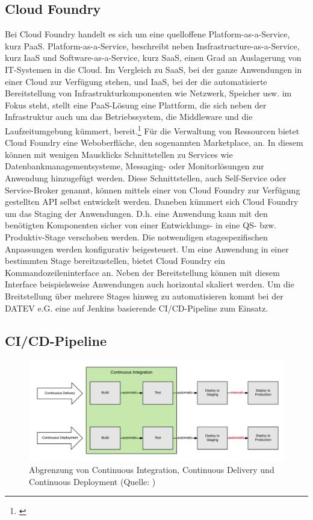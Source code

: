 \subsection{\glqq Cloud Foundry\grqq}
Bei Cloud Foundry handelt es sich um eine quelloffene Platform-as-a-Service, kurz PaaS.
Platform-as-a-Service, beschreibt neben Insfrastructure-as-a-Service, kurz IaaS und Software-as-a-Service, kurz SaaS, einen Grad an Auslagerung von IT-Systemen in die Cloud.
Im Vergleich zu SaaS, bei der ganze Anwendungen in einer Cloud zur Verfügung stehen, und IaaS, bei der die automatisierte Bereitstellung von Infrastrukturkomponenten wie Netzwerk, Speicher usw. im Fokus steht, stellt eine PaaS-Lösung eine Plattform, die sich neben der Infrastruktur auch um das Betriebssystem, die Middleware und die Laufzeitumgebung kümmert, bereit.\footnote{\cite{ipsaas.25.2.2020}}
Für die Verwaltung von Ressourcen bietet Cloud Foundry eine Weboberfläche, den sogenannten \glqq Marketplace\grqq, an.
In diesem können mit wenigen Mausklicks Schnittstellen zu Services wie Datenbankmanagementsysteme, Messaging- oder Monitorlösungen zur Anwendung hinzugefügt werden.
Diese Schnittstellen, auch \glqq Self-Service\grqq{} oder \glqq Service-Broker\grqq{} genannt, können mittels einer von Cloud Foundry zur Verfügung gestellten API selbst entwickelt werden.
Daneben kümmert sich Cloud Foundry um das Staging der Anwendungen.
D.h. eine Anwendung kann mit den benötigten Komponenten sicher von einer Entwicklungs- in eine QS- bzw. Produktiv-Stage verschoben werden. 
Die notwendigen stagespezifischen Anpassungen werden konfigurativ beigesteuert.
Um eine Anwendung in einer bestimmten Stage bereitzustellen, bietet Cloud Foundry ein Kommandozeileninterface an.
Neben der Bereitstellung können mit diesem Interface beispielsweise Anwendungen auch horizontal skaliert werden.
Um die Breitstellung über mehrere Stages hinweg zu automatisieren kommt bei der DATEV e.G. eine auf Jenkins basierende CI/CD-Pipeline zum Einsatz.
\cite{.23.2.2020c}

\subsection{\glqq CI/CD-Pipeline\grqq}\label{sec:cicd}
\begin{figure}[h]
	\centering
	\includegraphics[width=\textwidth]{figures/ci-cd-flow-desktop_1.png}
	\caption{Abgrenzung von Continuous Integration, Continuous Delivery und Continuous Deployment  (Quelle: \cite{.25.2.2020d})}
	\label{fig:cicd}
\end{figure}

